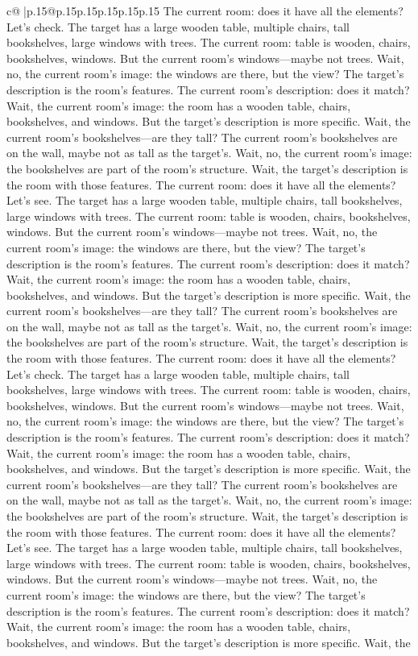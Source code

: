 \documentclass{article}
\begin{document}
{\begin{supertabular}{c@{$\;$}|p{.15\linewidth}@{}p{.15\linewidth}p{.15\linewidth}p{.15\linewidth}p{.15\linewidth}p{.15\linewidth}}
{{{The current room: does it have all the elements? Let's check. The target has a large wooden table, multiple chairs, tall bookshelves, large windows with trees. The current room: table is wooden, chairs, bookshelves, windows. But the current room's windows—maybe not trees. Wait, no, the current room's image: the windows are there, but the view? The target's description is the room's features. The current room's description: does it match? Wait, the current room's image: the room has a wooden table, chairs, bookshelves, and windows. But the target's description is more specific. Wait, the current room's bookshelves—are they tall? The current room's bookshelves are on the wall, maybe not as tall as the target's. Wait, no, the current room's image: the bookshelves are part of the room's structure. Wait, the target's description is the room with those features. The current room: does it have all the elements? Let's see. The target has a large wooden table, multiple chairs, tall bookshelves, large windows with trees. The current room: table is wooden, chairs, bookshelves, windows. But the current room's windows—maybe not trees. Wait, no, the current room's image: the windows are there, but the view? The target's description is the room's features. The current room's description: does it match? Wait, the current room's image: the room has a wooden table, chairs, bookshelves, and windows. But the target's description is more specific. Wait, the current room's bookshelves—are they tall? The current room's bookshelves are on the wall, maybe not as tall as the target's. Wait, no, the current room's image: the bookshelves are part of the room's structure. Wait, the target's description is the room with those features. The current room: does it have all the elements? Let's check. The target has a large wooden table, multiple chairs, tall bookshelves, large windows with trees. The current room: table is wooden, chairs, bookshelves, windows. But the current room's windows—maybe not trees. Wait, no, the current room's image: the windows are there, but the view? The target's description is the room's features. The current room's description: does it match? Wait, the current room's image: the room has a wooden table, chairs, bookshelves, and windows. But the target's description is more specific. Wait, the current room's bookshelves—are they tall? The current room's bookshelves are on the wall, maybe not as tall as the target's. Wait, no, the current room's image: the bookshelves are part of the room's structure. Wait, the target's description is the room with those features. The current room: does it have all the elements? Let's see. The target has a large wooden table, multiple chairs, tall bookshelves, large windows with trees. The current room: table is wooden, chairs, bookshelves, windows. But the current room's windows—maybe not trees. Wait, no, the current room's image: the windows are there, but the view? The target's description is the room's features. The current room's description: does it match? Wait, the current room's image: the room has a wooden table, chairs, bookshelves, and windows. But the target's description is more specific. Wait, the }}}
\end{supertabular}}
\end{document}
